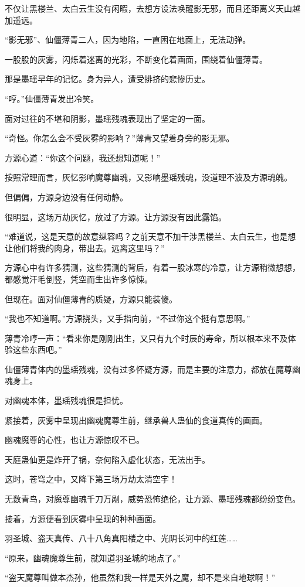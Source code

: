 \begin{this_body}
不仅让黑楼兰、太白云生没有闲暇，去想方设法唤醒影无邪，而且还距离义天山越加遥远。

“影无邪”、仙僵薄青二人，因为地陷，一直困在地面上，无法动弹。

一股股的灰雾，闪烁着迷离的光彩，不断变化着画面，围绕着仙僵薄青。

那是墨瑶早年的记忆。身为异人，遭受排挤的悲惨历史。

“哼。”仙僵薄青发出冷笑。

面对过往的不堪和阴影，墨瑶残魂表现出了坚定的一面。

“奇怪。你怎么会不受灰雾的影响？”薄青又望着身旁的影无邪。

方源心道：“你这个问题，我还想知道呢！”

按照常理而言，灰忆影响魔尊幽魂，又影响墨瑶残魂，没道理不波及方源魂魄。

但偏偏，方源身边没有任何动静。

很明显，这场万劫灰忆，放过了方源。让方源没有因此露馅。

“难道说，这是天意的故意纵容吗？之前天意不加干涉黑楼兰、太白云生，也是想让他们将我的肉身，带出去。远离这里吗？”

方源心中有许多猜测，这些猜测的背后，有着一股冰寒的冷意，让方源稍微想想，都感觉汗毛倒竖，凭空而生出许多惊悚。

但现在。面对仙僵薄青的质疑，方源只能装傻。

“我也不知道啊。”方源挠头，又手指向前，“不过你这个挺有意思啊。”

薄青冷哼一声：“看来你是刚刚出生，又只有九个时辰的寿命，所以根本来不及体验这些东西吧。”

仙僵薄青体内的墨瑶残魂，没有过多怀疑方源，而是主要的注意力，都放在魔尊幽魂身上。

对幽魂本体，墨瑶残魂很是担忧。

紧接着，灰雾中呈现出幽魂魔尊生前，继承兽人蛊仙的食道真传的画面。

幽魂魔尊的心性，也让方源惊叹不已。

天庭蛊仙更是炸开了锅，奈何陷入虚化状态，无法出手。

这时，苍穹之中，又降下第三场万劫太清空宇！

无数青鸟，对魔尊幽魂千刀万剐，威势恐怖绝伦，让方源、墨瑶残魂都纷纷变色。

接着，方源便看到灰雾中呈现的种种画面。

羽圣城、盗天真传、八十八角真阳楼之中、光阴长河中的红莲……

“原来，幽魂魔尊生前，就知道羽圣城的地点了。”

“盗天魔尊叫做本杰孙，他虽然和我一样是天外之魔，却不是来自地球啊！”


\end{this_body}
